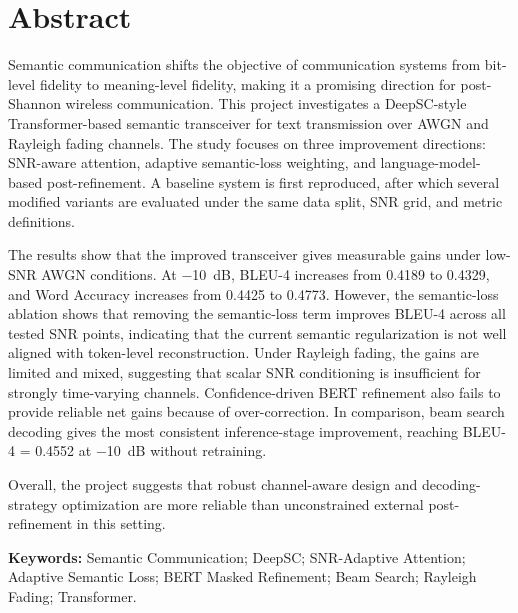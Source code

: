 \section*{Abstract}

Semantic communication shifts the objective of communication systems from bit-level fidelity to meaning-level fidelity, making it a promising direction for post-Shannon wireless communication. This project investigates a DeepSC-style Transformer-based semantic transceiver for text transmission over AWGN and Rayleigh fading channels. The study focuses on three improvement directions: SNR-aware attention, adaptive semantic-loss weighting, and language-model-based post-refinement. A baseline system is first reproduced, after which several modified variants are evaluated under the same data split, SNR grid, and metric definitions.

The results show that the improved transceiver gives measurable gains under low-SNR AWGN conditions. At \SI{-10}{dB}, BLEU-4 increases from 0.4189 to 0.4329, and Word Accuracy increases from 0.4425 to 0.4773. However, the semantic-loss ablation shows that removing the semantic-loss term improves BLEU-4 across all tested SNR points, indicating that the current semantic regularization is not well aligned with token-level reconstruction. Under Rayleigh fading, the gains are limited and mixed, suggesting that scalar SNR conditioning is insufficient for strongly time-varying channels. Confidence-driven BERT refinement also fails to provide reliable net gains because of over-correction. In comparison, beam search decoding gives the most consistent inference-stage improvement, reaching BLEU-4 = 0.4552 at \SI{-10}{dB} without retraining.

Overall, the project suggests that robust channel-aware design and decoding-strategy optimization are more reliable than unconstrained external post-refinement in this setting.

\vspace{0.5em}
\noindent\textbf{Keywords:} Semantic Communication; DeepSC; SNR-Adaptive Attention;
Adaptive Semantic Loss; BERT Masked Refinement; Beam Search; Rayleigh Fading;
Transformer.
